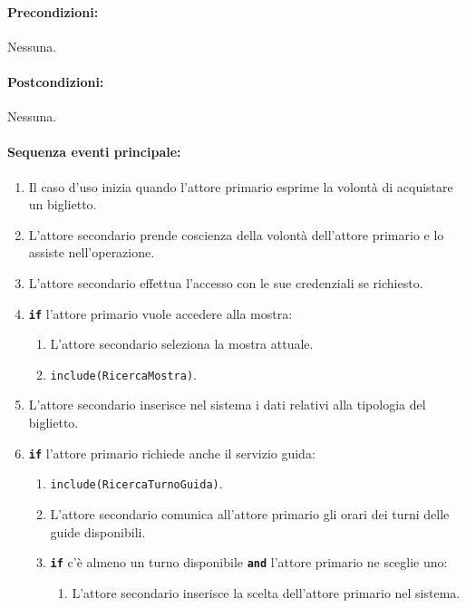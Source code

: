 \documentclass{article}
\begin{document}
	\paragraph{Precondizioni:}Nessuna.
	
	\paragraph{Postcondizioni:}Nessuna.
	
	\paragraph{Sequenza eventi principale:}

		\begin{enumerate}[itemsep=5pt,parsep=0pt]

		\item Il caso d'uso inizia quando l'attore primario esprime la volontà di acquistare un biglietto.

		\item L'attore secondario prende coscienza della volontà dell'attore primario e lo assiste nell'operazione.

		\item L'attore secondario effettua l'accesso con le sue credenziali se richiesto.

		\item \texttt{\textbf{if}} l'attore primario vuole accedere alla mostra:
			\begin{enumerate}	[leftmargin=28pt]
				\item L'attore secondario seleziona la mostra attuale.
				\item \texttt{{include(RicercaMostra)}}.
  			\end{enumerate}	

		\item L'attore secondario inserisce nel sistema i dati relativi alla tipologia del biglietto.

		\item \texttt{\textbf{if}} l'attore primario richiede anche il servizio guida:
			\begin{enumerate}[leftmargin=28pt]
				\item  \texttt{{include(RicercaTurnoGuida)}}.
				\item L'attore secondario comunica all'attore primario gli orari dei turni delle guide disponibili.
				\item \texttt{\textbf{if}} c'è almeno un turno disponibile \texttt{\textbf{and}} l'attore primario ne sceglie uno:
					\begin{enumerate}[leftmargin=34pt]
						\item L'attore secondario inserisce la scelta dell'attore primario nel sistema.
					\end{enumerate}
  			\end{enumerate}	


\end{enumerate}
\end{document}
